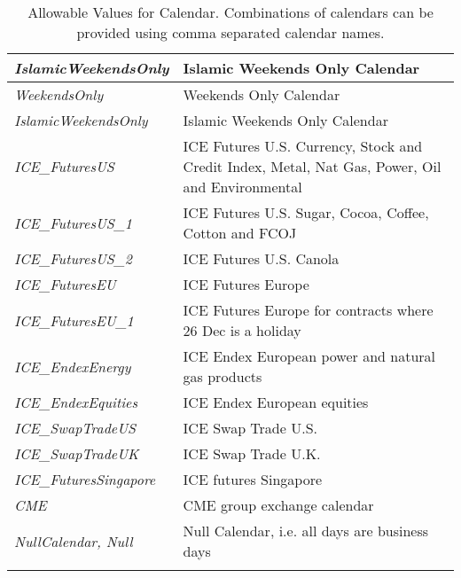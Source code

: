 \begin{longtable}{| p{} | p{} |}
    \emph{IslamicWeekendsOnly} & Islamic Weekends Only Calendar \\ \hline
    \emph{WeekendsOnly} & Weekends Only Calendar \\ \hline
    \emph{IslamicWeekendsOnly} & Islamic Weekends Only Calendar \\ \hline
    \emph{ICE\_FuturesUS} & ICE Futures U.S. Currency, Stock and Credit Index, Metal, Nat Gas, Power, Oil and Environmental \\ \hline
    \emph{ICE\_FuturesUS\_1} & ICE Futures U.S. Sugar, Cocoa, Coffee, Cotton and FCOJ \\ \hline
    \emph{ICE\_FuturesUS\_2} & ICE Futures U.S. Canola \\ \hline
    \emph{ICE\_FuturesEU} & ICE Futures Europe \\ \hline
    \emph{ICE\_FuturesEU\_1} & ICE Futures Europe for contracts where 26 Dec is a holiday \\ \hline
    \emph{ICE\_EndexEnergy} & ICE Endex European power and natural gas products \\ \hline
    \emph{ICE\_EndexEquities} & ICE Endex European equities \\ \hline
    \emph{ICE\_SwapTradeUS} & ICE Swap Trade U.S. \\ \hline
    \emph{ICE\_SwapTradeUK} & ICE Swap Trade U.K. \\ \hline
    \emph{ICE\_FuturesSingapore} & ICE futures Singapore \\ \hline
    \emph{CME} & CME group exchange calendar \\ \hline
    \emph{NullCalendar, Null} & Null Calendar, i.e. all days are business days \\ \hline                 
  \caption{Allowable Values for Calendar. Combinations of calendars can be provided using comma separated calendar names.}
  \label{tab:calendar}
\end{longtable}

